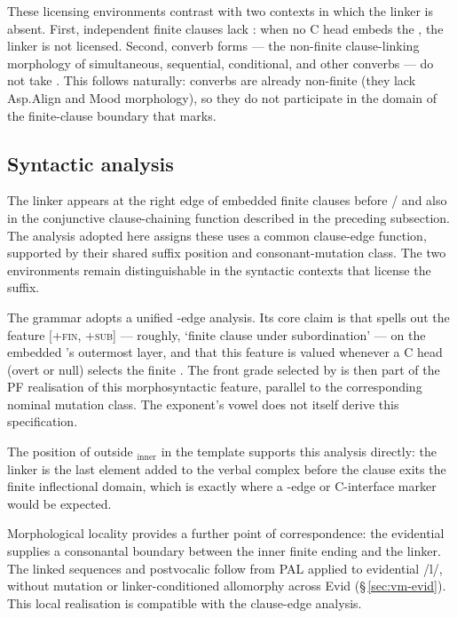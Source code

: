 These licensing environments contrast with two contexts in which the linker
is absent. First, independent finite clauses lack : when no C head embeds the , the linker
is not licensed. Second, converb forms --- the non-finite clause-linking
morphology of simultaneous, sequential, conditional, and other converbs --- do
not take . This follows naturally: converbs are already non-finite (they
lack Asp.Align and Mood morphology), so they do not participate in the domain of
the finite-clause boundary that  marks.

\subsection{Syntactic analysis}
\label{sec:vm-tension-linker}

The linker  appears at the right edge of embedded finite clauses before
/ and also in the conjunctive clause-chaining function
described in the preceding subsection. The analysis adopted here assigns these
uses a common clause-edge function, supported by their shared suffix position and
consonant-mutation class. The two environments remain distinguishable
in the syntactic contexts that license the suffix.

The grammar adopts a unified -edge analysis.
Its core claim is that  spells out the feature \textsc{[+fin, +sub]} ---
roughly, `finite clause under subordination' --- on the embedded 's
outermost layer, and that this feature is valued whenever a C head (overt or
null) selects the finite . The front grade selected by
 is then part of the PF realisation of this morphosyntactic feature,
parallel to the corresponding nominal mutation class. The exponent's vowel
does not itself derive this specification.

The position of  outside $_\text{inner}$ in the template
supports this analysis directly: the linker is the last element added to the
verbal complex before the clause exits the finite inflectional domain, which is
exactly where a -edge or C-interface marker would be expected.

Morphological locality provides a further point of correspondence: the
evidential supplies a consonantal boundary between the inner finite ending
and the linker. The linked sequences  and
postvocalic  follow from PAL applied to evidential /l/,
without mutation or linker-conditioned allomorphy across Evid
(§\,\ref{sec:vm-evid}). This local realisation is compatible with the clause-edge analysis.

